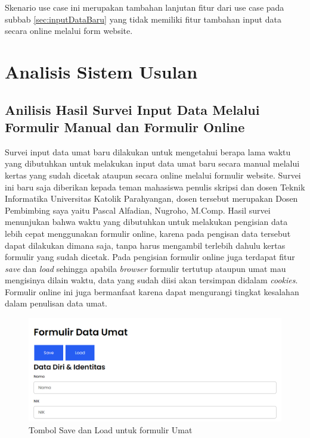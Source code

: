 \begin{enumerate}
\begin{itemize}
Skenario use case ini merupakan tambahan lanjutan fitur dari use case pada subbab \ref{sec:inputDataBaru} yang tidak memiliki fitur tambahan input data secara online melalui form website.

\newpage

\section{Analisis Sistem Usulan}
\label{sec:analisisSistemusulan}

\subsection{Anilisis Hasil Survei Input Data Melalui Formulir Manual dan Formulir Online}

Survei input data umat baru dilakukan untuk mengetahui berapa lama waktu yang dibutuhkan untuk melakukan input data umat baru secara manual melalui kertas yang sudah dicetak ataupun secara online melalui formulir website. Survei ini baru saja diberikan kepada teman mahasiswa penulis skripsi dan dosen Teknik Informatika Universitas Katolik Parahyangan, dosen tersebut merupakan Dosen Pembimbing saya yaitu Pascal Alfadian, Nugroho, M.Comp. Hasil survei menunjukan bahwa waktu yang dibutuhkan untuk melakukan pengisian data lebih cepat menggunakan formulir online, karena pada pengisan data tersebut dapat dilakukan dimana saja, tanpa harus mengambil terlebih dahulu kertas formulir yang sudah dicetak. Pada pengisian formulir online juga terdapat fitur \textit{save} dan \textit{load} sehingga apabila \textit{browser} formulir tertutup ataupun umat mau mengisinya dilain waktu, data yang sudah diisi akan tersimpan didalam \textit{cookies}. Formulir online ini juga bermanfaat karena dapat mengurangi tingkat kesalahan dalam penulisan data umat.

\begin{figure}[H]
	\centering
	\includegraphics[scale=0.7]{Gambar/formUmat.png}
	\caption{Tombol Save dan Load untuk formulir Umat} 
	\label{fig:loadSave}
\end{figure}


\end{itemize}
\end{enumerate}
